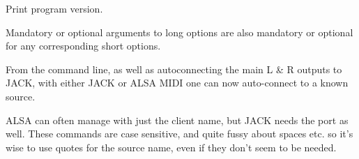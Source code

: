       Print program version.

   Mandatory or optional arguments to long options are also mandatory or
   optional for any corresponding short options.

   From the command line, as well as autoconnecting the main L \& R outputs
   to JACK, with either JACK or ALSA MIDI one can now auto-connect to a
   known source.

   ALSA can often manage with just the client name, but JACK needs the port
   as well. These commands are case sensitive, and quite fussy about spaces
   etc. so it's wise to use quotes for the source name, even if they don't
   seem to be needed.

